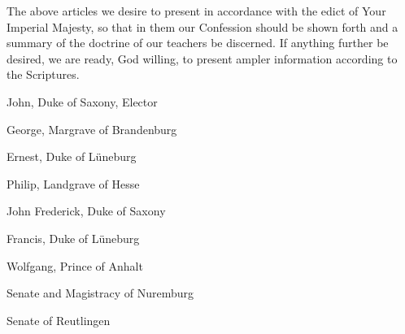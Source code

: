 The above articles we desire to present in accordance with the edict of Your Imperial Majesty, so that in them our Confession should be shown forth and a summary of the doctrine of our teachers be discerned. If anything further be desired, we are ready, God willing, to present ampler information according to the Scriptures.

John, Duke of Saxony, Elector

George, Margrave of Brandenburg

Ernest, Duke of Lüneburg

Philip, Landgrave of Hesse

John Frederick, Duke of Saxony

Francis, Duke of Lüneburg

Wolfgang, Prince of Anhalt

Senate and Magistracy of Nuremburg

Senate of Reutlingen

 
